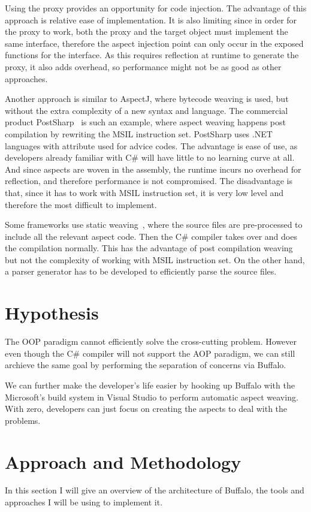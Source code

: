 Using the proxy provides an opportunity for code injection. The advantage of this approach is relative ease of implementation. It is also limiting since in order for the proxy to work, both the proxy and the target object must implement the same interface, therefore the aspect injection point can only occur in the exposed functions for the interface. As this requires reflection at runtime to generate the proxy, it also adds overhead, so performance might not be as good as other approaches.

Another approach is similar to AspectJ, where bytecode weaving is used, but without the extra complexity of a new syntax and language. The commercial product PostSharp~\cite{postsharp} is such an example, where aspect weaving happens post compilation by rewriting the MSIL instruction set. PostSharp uses .NET languages with attribute used for advice codes. The advantage is ease of use, as developers already familiar with C\# will have little to no learning curve at all. And since aspects are woven in the assembly, the runtime incurs no overhead for reflection, and therefore performance is not compromised. The disadvantage is that, since it has to work with MSIL instruction set, it is very low level and therefore the most difficult to implement.

Some frameworks use static weaving~\cite{aspectcs}, where the source files are pre-processed to include all the relevant aspect code. Then the C\# compiler takes over and does the compilation normally. This has the advantage of post compilation weaving but not the complexity of working with MSIL instruction set. On the other hand, a parser generator has to be developed to efficiently parse the source files.

\section{Hypothesis}
The OOP paradigm cannot efficiently solve the cross-cutting problem. However even though the C\# compiler will not support the AOP paradigm, we can still archieve the same goal by performing the separation of concerns via Buffalo.

We can further make the developer's life easier by hooking up Buffalo with the Microsoft's build system in Visual Studio to perform automatic aspect weaving. With zero, developers can just focus on creating the aspects to deal with the problems.

\section{Approach and Methodology}
In this section I will give an overview of the architecture of Buffalo, the tools and approaches I will be using to implement it.

